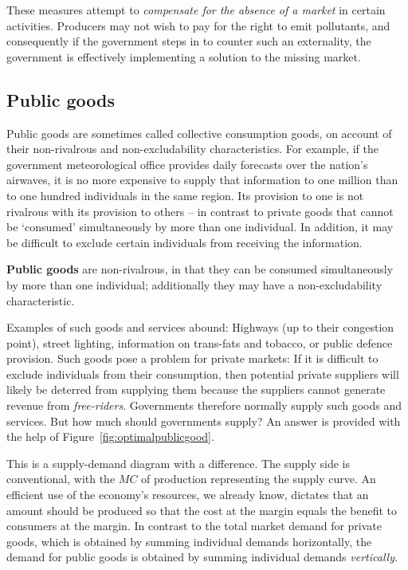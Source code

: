 These measures attempt to \textit{compensate for the absence of a market} in
certain activities. Producers may not wish to pay for the right to emit
pollutants, and consequently if the government steps in to counter such an
externality, the government is effectively implementing a solution to the
missing market.

\newhtmlpage

\subsection*{Public goods}

Public goods are sometimes called collective consumption goods, on account
of their non-rivalrous and non-excludability characteristics. For example,
if the government meteorological office provides daily forecasts over the
nation's airwaves, it is no more expensive to supply that information to one
million than to one hundred individuals in the same region. Its provision to
one is not rivalrous with its provision to others -- in contrast to private
goods that cannot be `consumed' simultaneously by more than one individual.
In addition, it may be difficult to exclude certain individuals from
receiving the information.

\begin{DefBox}
	\textbf{Public goods} are non-rivalrous, in that they can be consumed simultaneously by more than one individual; additionally they may have a non-excludability characteristic.
\end{DefBox}

\newhtmlpage

Examples of such goods and services abound: Highways (up to their congestion
point), street lighting, information on trans-fats and tobacco, or public
defence provision. Such goods pose a problem for private markets: If it is
difficult to exclude individuals from their consumption, then potential
private suppliers will likely be deterred from supplying them because the
suppliers cannot generate revenue from \textit{free-riders}. Governments
therefore normally supply such goods and services. But how much should
governments supply? An answer is provided with the help of Figure~\ref{fig:optimalpublicgood}.



\newhtmlpage

This is a supply-demand diagram with a difference. The supply side is
conventional, with the $MC$ of production representing the supply curve. An
efficient use of the economy's resources, we already know, dictates that an
amount should be produced so that the cost at the margin equals the benefit
to consumers at the margin. In contrast to the total market demand for
private goods, which is obtained by summing individual demands horizontally,
the demand for public goods is obtained by summing individual demands 
\textit{vertically}.

